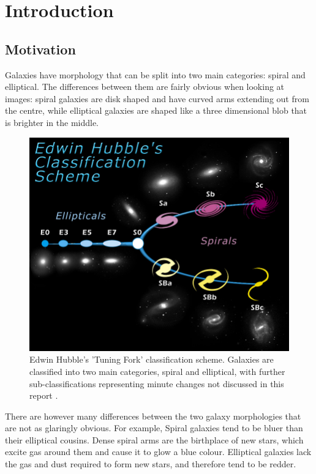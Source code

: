 \section{Introduction}
\label{sec:intro}
\subsection{Motivation}
Galaxies have morphology that can be split into two main categories: spiral and elliptical. 
The differences between them are fairly obvious when looking at images: spiral galaxies are disk shaped and have curved arms extending out from the centre, while elliptical galaxies are shaped like a three dimensional blob that is brighter in the middle. 

\begin{figure}[h]
	\centering
	\captionsetup{justification=centering,width=.8\linewidth}
	\includegraphics[scale=0.7]{Figures/TuningFork.jpg}
	\caption{Edwin Hubble's 'Tuning Fork' classification scheme. Galaxies are classified into two main categories, spiral and elliptical, with further sub-classifications representing minute changes not discussed in this report \cite{TuningFork}.}
	\label{fig:tuningfork}
\end{figure}


There are however many differences between the two galaxy morphologies that are not as glaringly obvious.  
For example, Spiral galaxies tend to be bluer than their elliptical cousins. 
Dense spiral arms are the birthplace of new stars, which excite gas around them and cause it to glow a blue colour. 
Elliptical galaxies lack the gas and dust required to form new stars, and therefore tend to be redder.

